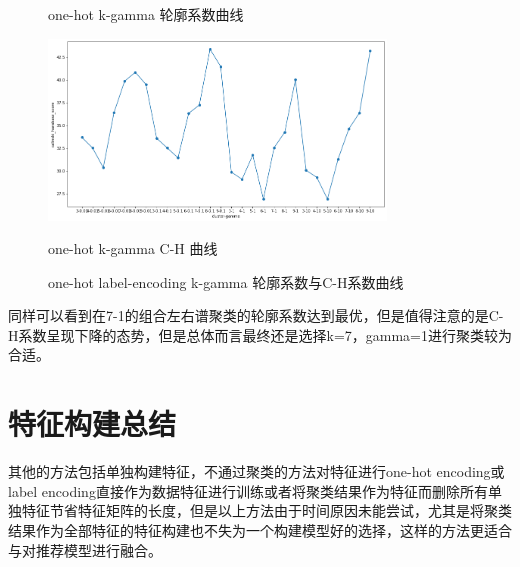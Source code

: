 \begin{figure}[htb]
\begin{minipage}[htb]{0.4\linewidth}
        \caption{one-hot k-gamma 轮廓系数曲线}
    \end{minipage}
    \begin{minipage}[htb]{0.4\linewidth}
        \includegraphics[width=0.8\textwidth]{images/Spectral-clustering-c-h-one-hot.png}
        \caption{one-hot k-gamma C-H 曲线}
    \end{minipage}
    \caption{one-hot label-encoding k-gamma 轮廓系数与C-H系数曲线}\label{label-encoding-one-hot-k-gamma-sc-c-h} %
\end{figure}

同样可以看到在7-1的组合左右谱聚类的轮廓系数达到最优，但是值得注意的是C-H系数呈现下降的态势，但是总体而言最终还是选择k=7，gamma=1进行聚类较为合适。

\section{特征构建总结}

其他的方法包括单独构建特征，不通过聚类的方法对特征进行one-hot encoding或label encoding直接作为数据特征进行训练或者将聚类结果作为特征而删除所有单独特征节省特征矩阵的长度，但是以上方法由于时间原因未能尝试，尤其是将聚类结果作为全部特征的特征构建也不失为一个构建模型好的选择，这样的方法更适合与对推荐模型进行融合。

